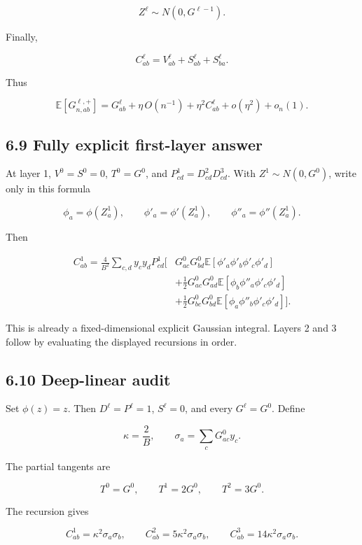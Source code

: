 \[
Z^\ell\sim N(0,G^{\ell-1}).
\]


Finally,

\[
\boxed{
C^\ell_{ab}
=
V^\ell_{ab}+S^\ell_{ab}+S^\ell_{ba}.
}
\]


Thus

\[
\boxed{
\mathbb E[G^{\ell,+}_{n,ab}]
=
G^\ell_{ab}
+\eta\,O(n^{-1})
+\eta^2C^\ell_{ab}
+o(\eta^2)+o_n(1).
}
\]


\subsection*{6.9 Fully explicit first-layer answer}


At layer 1, \(V^0=S^0=0\), \(T^0=G^0\), and
\(P^1_{cd}=D^2_{cd}D^3_{cd}\). With
\(Z^1\sim N(0,G^0)\), write only in this formula

\[
\phi_a=\phi(Z^1_a),
\qquad
\phi'_a=\phi'(Z^1_a),
\qquad
\phi''_a=\phi''(Z^1_a).
\]


Then

\[
\boxed{
\begin{aligned}
C^1_{ab}
=
\frac4{B^2}\sum_{c,d}y_cy_dP^1_{cd}
\Bigg[&
G^0_{ac}G^0_{bd}
\mathbb E[\phi'_a\phi'_b\phi'_c\phi'_d]
\\
&+
\frac12G^0_{ac}G^0_{ad}
\mathbb E[\phi_b\phi''_a\phi'_c\phi'_d]
\\
&+
\frac12G^0_{bc}G^0_{bd}
\mathbb E[\phi_a\phi''_b\phi'_c\phi'_d]
\Bigg].
\end{aligned}
}
\]


This is already a fixed-dimensional explicit Gaussian integral. Layers 2 and
3 follow by evaluating the displayed recursions in order.

\subsection*{6.10 Deep-linear audit}


Set \(\phi(z)=z\). Then \(D^\ell=P^\ell=1\),
\(S^\ell=0\), and every \(G^\ell=G^0\). Define

\[
\kappa=\frac2B,
\qquad
\sigma_a=\sum_cG^0_{ac}y_c.
\]


The partial tangents are

\[
T^0=G^0,\qquad T^1=2G^0,\qquad T^2=3G^0.
\]


The recursion gives

\[
\boxed{
C^1_{ab}=\kappa^2\sigma_a\sigma_b,\qquad
C^2_{ab}=5\kappa^2\sigma_a\sigma_b,\qquad
C^3_{ab}=14\kappa^2\sigma_a\sigma_b.
}
\]


